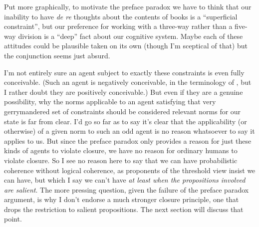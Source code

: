 \noindent Put more graphically, to motivate the preface paradox we have to think that our inability to have \textit{de re} thoughts about the contents of books is a ``superficial constraint'', but our preference for working with a three-way rather than a five-way division is a ``deep'' fact about our cognitive system. Maybe each of these attitudes could be plausible taken on its own (though I'm sceptical of that) but the conjunction seems just absurd.

I'm not entirely sure an agent subject to exactly these constraints is even fully conceivable. (Such an agent is negatively conceivable, in the terminology of \cite{Chalmers2002}, but I rather doubt they are positively conceivable.) But even if they are a genuine possibility, why the norms applicable to an agent satisfying that very gerrymandered set of constraints should be considered relevant norms for our state is far from clear. I'd go so far as to say it's clear that the applicability (or otherwise) of a given norm to such an odd agent is no reason whatsoever to say it applies to us. But since the preface paradox only provides a reason for just these kinds of agents to violate closure, we have no reason for ordinary humans to violate closure. So I see no reason here to say that we can have probabilistic coherence without logical coherence, as proponents of the threshold view insist we can have, but which I say we can't have \textit{at least when the propositions involved are salient}. The more pressing question, given the failure of the preface paradox argument, is why I don't endorse a much stronger closure principle, one that drops the restriction to salient propositions. The next section will discuss that point.

